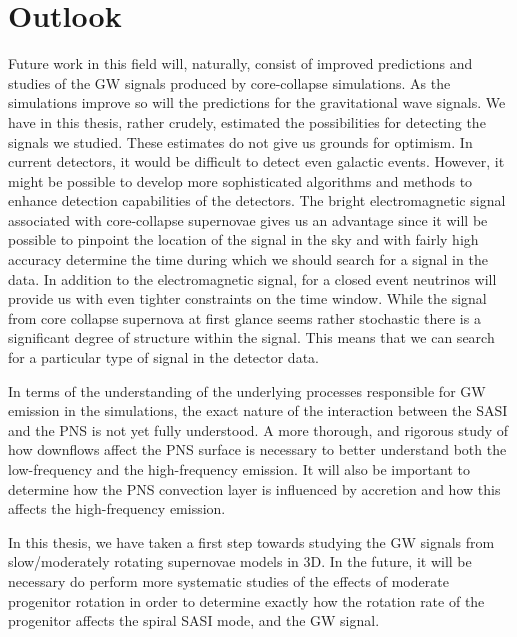 \section{Outlook}
Future work in this field will, naturally, consist of improved predictions and studies of the GW signals produced by core-collapse simulations. 
As the simulations improve so will the predictions for the gravitational wave signals. 
We have in this thesis, rather crudely, estimated the possibilities for detecting the signals we studied. 
These estimates do not give us grounds for optimism. In current detectors, it would be difficult to detect even galactic events. 
However, it might be possible to develop more sophisticated algorithms and methods to enhance detection capabilities of the detectors. 
The bright electromagnetic signal associated with core-collapse supernovae gives us an advantage since it will be possible to pinpoint the location of the signal in the sky and with fairly high accuracy determine the time during which we should search for a signal in the data. In addition to the electromagnetic signal, 
for a closed event neutrinos will provide us with even tighter constraints on the time window. 
While the signal from core collapse supernova at first glance seems rather stochastic there is a significant degree of structure within the signal. This means that we can search for a particular type of signal in the detector data. 

In terms of the understanding of the underlying processes responsible for GW emission in the simulations, the exact nature
of the interaction between the SASI and the PNS is not yet fully understood. A more thorough, and rigorous study of
how downflows affect the PNS surface is necessary to better understand both the low-frequency and the high-frequency emission.
It will also be important to determine how the PNS convection layer is influenced by accretion and how this affects
the high-frequency emission.

In this thesis, we have taken a first step towards studying the GW signals from slow/moderately rotating supernovae models in 3D. In the future, it will be necessary do perform more systematic studies of the effects of moderate progenitor rotation in order to determine exactly how
the rotation rate of the progenitor affects the spiral SASI mode, and the GW signal.

